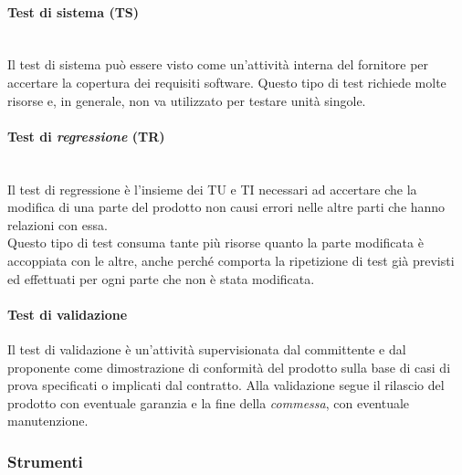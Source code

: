 		\paragraph{Test di sistema (TS)}
		~\\Il test di sistema può essere visto come un'attività interna del fornitore
		per accertare la copertura dei requisiti software.
		\newline{}Questo tipo di test richiede molte risorse e, in generale, non va utilizzato per testare
		unità singole.
		\paragraph{Test di \emph{regressione} (TR)}
		~\\Il test di regressione è l'insieme dei TU e TI necessari ad accertare che la modifica
		di una parte del prodotto non causi errori nelle altre parti che hanno relazioni con essa.
		\\Questo tipo di test consuma tante più risorse quanto la parte modificata è accoppiata con le altre, 
		anche perché comporta la ripetizione di test già previsti ed effettuati per ogni parte che non è 
		stata modificata.
		\paragraph{Test di validazione}
		Il test di validazione è un'attività supervisionata dal committente e dal proponente come dimostrazione di conformità del prodotto sulla base 
		di casi di prova specificati o implicati dal contratto.
		Alla validazione segue il rilascio del prodotto con eventuale garanzia e la fine della
		\emph{commessa},	con eventuale manutenzione.
	
	\subsubsection{Strumenti}

